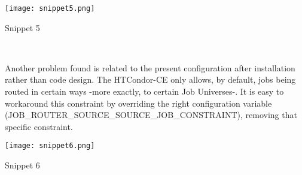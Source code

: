 \documentclass[a4paper]{jpconf}
\begin{document}
\begin{snippet}[h]
    \centering
    \renewcommand\figurename{Snippet}
    \texttt{[image: snippet5.png]}
    \caption{Snippet 5}
    \label{fig:snippet5}
\end{snippet}


~

Another problem found is related to the present configuration after installation rather than code design. 
The HTCondor-CE only allows, by default, jobs being routed in certain ways -more exactly, to certain Job Universes-.
It is easy to workaround this constraint by overriding the right configuration
variable (JOB\_ROUTER\_SOURCE\_SOURCE\_JOB\_CONSTRAINT), removing that specific
constraint.

\begin{snippet}[h]
    \centering
    \renewcommand\figurename{Snippet}
    \texttt{[image: snippet6.png]}
    \caption{Snippet 6}
    \label{fig:snippet6}
\end{snippet}

\end{document}

